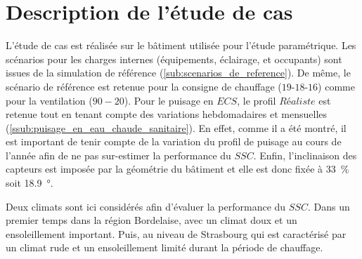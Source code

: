 






\section{Description de l’étude de cas} %
\label{sec:description_de_l_etude_de_cas}
L’étude de cas est réalisée sur le bâtiment utilisée pour l’étude paramétrique.
Les scénarios pour les charges internes (équipements, éclairage, et occupants) sont
issues de la simulation de référence (\ref{sub:scenarios_de_reference}). De même,
le scénario de référence est retenue pour la consigne de chauffage ($19$-$18$-$16$)
comme pour la ventilation ($90-20$).
Pour le puisage en $ECS$, le profil $Réaliste$ est retenue tout en tenant compte des
variations hebdomadaires et mensuelles (\ref{ssub:puisage_en_eau_chaude_sanitaire}).
En effet, comme il a été montré, il est important de tenir compte de la variation
du profil de puisage au cours de l’année afin de ne pas sur-estimer la performance
du $SSC$. Enfin, l’inclinaison des capteurs est imposée par la géométrie du bâtiment et
elle est donc fixée à \SI{33}{\percent} soit \SI{18.9}{\degree}.

Deux climats sont ici considérés afin d’évaluer la performance du $SSC$. Dans un premier temps
dans la région Bordelaise, avec un climat doux et un ensoleillement important. Puis,
au niveau de Strasbourg qui est caractérisé par un climat rude et un ensoleillement
limité durant la période de chauffage.

